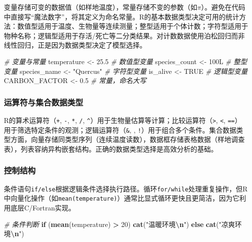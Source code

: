 \documentclass[
  twoside,12pt,fontset=none]{ctexbook}
\newenvironment{Shaded}{\begin{snugshade}}{\end{snugshade}}
\newcommand{\CommentTok}[1]{\textcolor[rgb]{0.56,0.35,0.01}{\textit{#1}}}
\newcommand{\ConstantTok}[1]{\textcolor[rgb]{0.56,0.35,0.01}{#1}}
\newcommand{\ControlFlowTok}[1]{\textcolor[rgb]{0.13,0.29,0.53}{\textbf{#1}}}
\newcommand{\DataTypeTok}[1]{\textcolor[rgb]{0.13,0.29,0.53}{#1}}
\newcommand{\DecValTok}[1]{\textcolor[rgb]{0.00,0.00,0.81}{#1}}
\newcommand{\FloatTok}[1]{\textcolor[rgb]{0.00,0.00,0.81}{#1}}
\newcommand{\FunctionTok}[1]{\textcolor[rgb]{0.13,0.29,0.53}{\textbf{#1}}}
\newcommand{\NormalTok}[1]{#1}
\newcommand{\OtherTok}[1]{\textcolor[rgb]{0.56,0.35,0.01}{#1}}
\newcommand{\SpecialCharTok}[1]{\textcolor[rgb]{0.81,0.36,0.00}{\textbf{#1}}}
\newcommand{\StringTok}[1]{\textcolor[rgb]{0.31,0.60,0.02}{#1}}
\begin{document}
变量存储可变的数据值（如样地温度），常量存储不变的参数（如\(\pi\)）。避免在代码中直接写``魔法数字''，将其定义为命名常量。R的基本数据类型决定可用的统计方法：数值型适用于温度、生物量等连续测量；整型适用于个体计数；字符型适用于物种名称；逻辑型适用于存活/死亡等二分类结果。对计数数据使用泊松回归而非线性回归，正是因为数据类型决定了模型选择。

\begin{Shaded}
\begin{Highlighting}[]
\CommentTok{\# 变量与常量}
\NormalTok{temperature }\OtherTok{\textless{}{-}} \FloatTok{25.5}        \CommentTok{\# 数值型变量}
\NormalTok{species\_count }\OtherTok{\textless{}{-}} \DecValTok{100}\DataTypeTok{L}      \CommentTok{\# 整型变量}
\NormalTok{species\_name }\OtherTok{\textless{}{-}} \StringTok{"Quercus"}  \CommentTok{\# 字符型变量}
\NormalTok{is\_alive }\OtherTok{\textless{}{-}} \ConstantTok{TRUE}           \CommentTok{\# 逻辑型变量}
\NormalTok{CARBON\_FACTOR }\OtherTok{\textless{}{-}} \FloatTok{0.5}       \CommentTok{\# 常量，命名大写}
\end{Highlighting}
\end{Shaded}

\hypertarget{ux8fd0ux7b97ux7b26ux4e0eux96c6ux5408ux6570ux636eux7c7bux578b}{%
\subsubsection{运算符与集合数据类型}\label{ux8fd0ux7b97ux7b26ux4e0eux96c6ux5408ux6570ux636eux7c7bux578b}}

R的算术运算符（\texttt{+}, \texttt{-}, \texttt{*}, \texttt{/}, \texttt{\^{}}）用于生物量估算等计算；比较运算符（\texttt{\textgreater{}}, \texttt{\textless{}}, \texttt{==}）用于筛选特定条件的观测；逻辑运算符（\texttt{\&}, \texttt{\textbar{}}, \texttt{!}）用于组合多个条件。集合数据类型方面，向量存储同类型序列（连续温度读数），数据框存储表格数据（样地调查表），列表容纳异构嵌套结构。正确的数据类型选择是高效分析的基础。

\hypertarget{ux63a7ux5236ux7ed3ux6784}{%
\subsubsection{控制结构}\label{ux63a7ux5236ux7ed3ux6784}}

条件语句\texttt{if/else}根据逻辑条件选择执行路径。循环\texttt{for/while}处理重复操作，但R中向量化操作（如\texttt{mean(temperature)}）通常比显式循环更快且更简洁，因为它利用底层C/Fortran实现。

\begin{Shaded}
\begin{Highlighting}[]
\CommentTok{\# 条件判断}
\ControlFlowTok{if}\NormalTok{ (}\FunctionTok{mean}\NormalTok{(temperature) }\SpecialCharTok{\textgreater{}} \DecValTok{20}\NormalTok{) }\FunctionTok{cat}\NormalTok{(}\StringTok{"温暖环境}\SpecialCharTok{\textbackslash{}n}\StringTok{"}\NormalTok{) }\ControlFlowTok{else} \FunctionTok{cat}\NormalTok{(}\StringTok{"凉爽环境}\SpecialCharTok{\textbackslash{}n}\StringTok{"}\NormalTok{)}
\end{Highlighting}
\end{Shaded}
\end{document}

